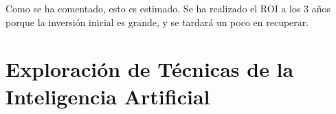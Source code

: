 Como se ha comentado, esto es estimado. Se ha realizado el ROI a los 3 años porque la inversión inicial es grande, y se tardará un poco en recuperar.

\section{Exploración de Técnicas de la Inteligencia Artificial}

\newpage





  